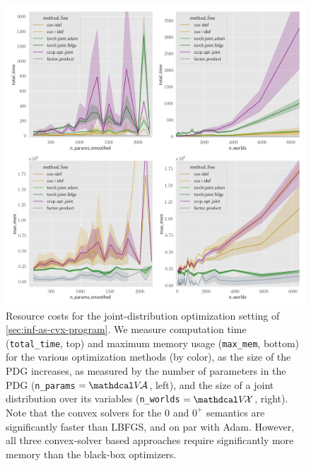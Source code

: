 \begin{subappendices}
\begin{figure}
    \includegraphics[width=\linewidth]{figs/rand-joint/resource-costs}
    \caption[More details: resource costs for joint-distribution optimization setting]{
        Resource costs for the joint-distribution optimization setting of \cref{sec:inf-as-cvx-program}.
        We measure computation time (\texttt{total\_time}, top) and maximum memory usage (\texttt{max\_mem}, bottom) for the various optimization methods (by color), as the size of the PDG increases, as measured by the number of parameters in the PDG (\texttt{n\_params}$\,=\V\!\Ar$, left), and the size of a joint distribution over its variables (\texttt{n\_worlds}$\,=\V\!\X$, right).
        Note that the convex solvers for the 0 and $0^+$ semantics are significantly faster than LBFGS, and on par with Adam.
        However, all three convex-solver based approaches require significantly more memory than the black-box optimizers.
     }\label{fig:resources}
\end{figure}




\end{subappendices}
